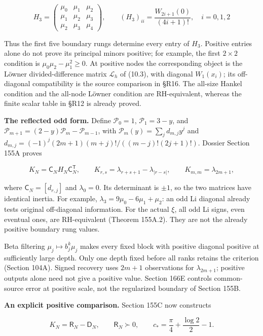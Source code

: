 \documentclass[
  11pt,
]{book}
\begin{document}
\[
\boxed{H_3=\begin{pmatrix}
\mu_0&\mu_1&\mu_2\\
\mu_1&\mu_2&\mu_3\\
\mu_2&\mu_3&\mu_4
\end{pmatrix},\qquad
(H_3)_{ii}=\frac{W_{2i+1}(0)}{(4i+1)!},\quad i=0,1,2}
\tag{15.5}
\]

Thus the first five boundary rungs determine every entry of \(H_3\).
Positive entries alone do not prove its principal minors positive; for
example, the first \(2\times2\) condition is \(\mu_0\mu_2-\mu_1^2\ge0\).
At positive nodes the corresponding object is the Löwner
divided-difference matrix \(\mathcal L_h\) of (10.3), with diagonal
\(W_1(x_i)\); its off-diagonal compatibility is the source comparison in
§R16. The all-size Hankel condition and the all-node Löwner condition
are RH-equivalent, whereas the finite scalar table in §R12 is already
proved.

\textbf{The reflected odd form.} Define \(\mathcal P_0=1\),
\(\mathcal P_1=3-y\), and
\(\mathcal P_{m+1}=(2-y)\mathcal P_m-\mathcal P_{m-1}\), with
\(\mathcal P_m(y)=\sum_jd_{m,j}y^j\) and
\(d_{m,j}=(-1)^j(2m+1)(m+j)!/((m-j)!(2j+1)!)\). Dossier Section 155A
proves

\[
\boxed{K_N=\mathsf C_NH_N\mathsf C_N^{\mathsf T},\qquad
K_{r,s}=\lambda_{r+s+1}-\lambda_{|r-s|},\qquad
K_{m,m}=\lambda_{2m+1},}
\tag{15.6}
\]

where \(\mathsf C_N=[d_{r,j}]\) and \(\lambda_0=0\). Its determinant is
\(\pm1\), so the two matrices have identical inertia. For example,
\(\lambda_3=9\mu_0-6\mu_1+\mu_2\): an odd Li diagonal already tests
original off-diagonal information. For the actual \(\xi\), all odd Li
signs, even eventual ones, are RH-equivalent (Theorem 155A.2). They are
not the already positive boundary rung values.

Beta filtering \(\mu_j\mapsto b_j^k\mu_j\) makes every fixed block with
positive diagonal positive at sufficiently large depth. Only one depth
fixed before all ranks retains the criterion (Section 104A). Signed
recovery uses \(2m+1\) observations for \(\lambda_{2m+1}\); positive
outputs alone need not give a positive value. Section 166E controls
common-source error at positive scale, not the regularized boundary of
Section 155B.

\textbf{An explicit positive comparison.} Section 155C now constructs

\[
\boxed{K_N=\mathsf R_N-\mathsf D_N,\qquad \mathsf R_N\succ0,\qquad
c_* =\frac\pi4+\frac{\log2}{2}-1.}
\tag{15.7}
\]
\end{document}
